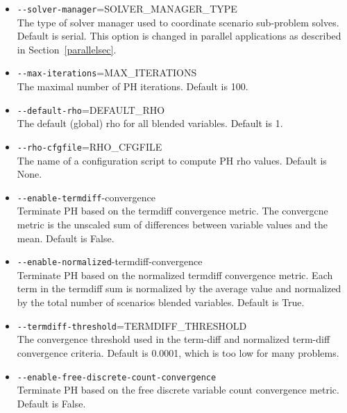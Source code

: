 \begin{itemize}
  \item \verb|--solver-manager|=SOLVER\_MANAGER\_TYPE                        \\
  The type of solver manager used to coordinate scenario sub-problem solves.
  Default is serial. This option is changed in parallel applications as
  described in Section~\ref{parallelsec}.

  \item \verb|--max-iterations|=MAX\_ITERATIONS                              \\
  The maximal number of PH iterations. Default is 100.

  \item \verb|--default-rho|=DEFAULT\_RHO                                    \\
  The default (global) rho for all blended variables. Default is 1.

  \item \verb|--rho-cfgfile|=RHO\_CFGFILE                                    \\
  The name of a configuration script to compute PH rho values. Default is None.

  \item \verb|--enable-termdiff|-convergence                                 \\
  Terminate PH based on the termdiff convergence metric. The convergcne metric
  is the unscaled sum of differences between variable values and the mean.
  Default is False.

  \item \verb|--enable-normalized|-termdiff-convergence                      \\
  Terminate PH based on the normalized termdiff convergence metric. Each term in
  the termdiff sum is normalized by the average value and
  normalized by the total number of scenarios blended variables. Default is True.

  \item \verb|--termdiff-threshold|=TERMDIFF\_THRESHOLD                      \\
  The convergence threshold used in the term-diff and normalized term-diff
  convergence criteria. Default is 0.0001, which is too low for many problems.

  \item \verb|--enable-free-discrete-count-convergence|                      \\
  Terminate PH based on the free discrete variable count convergence metric.
  Default is False.


\end{itemize}
